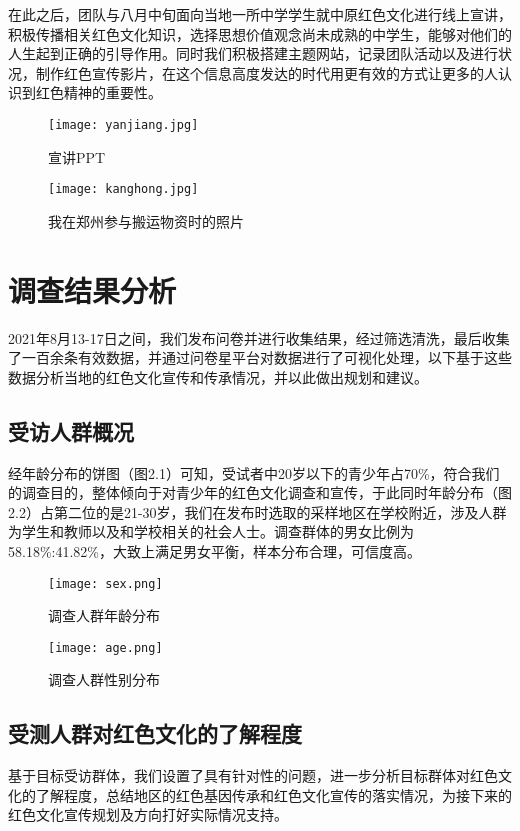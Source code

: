 \documentclass[AutoFakeBold]{LZUThesis}
\begin{document}
在此之后，团队与八月中旬面向当地一所中学学生就中原红色文化进行线上宣讲，积极传播相关红色文化知识，选择思想价值观念尚未成熟的中学生，能够对他们的人生起到正确的引导作用。同时我们积极搭建主题网站，记录团队活动以及进行状况，制作红色宣传影片，在这个信息高度发达的时代用更有效的方式让更多的人认识到红色精神的重要性。
\begin{figure}[htbp]
    \centering
    \texttt{[image: yanjiang.jpg]}
    \caption{宣讲PPT}
\end{figure}
\begin{figure}[htbp]
    \centering
    \texttt{[image: kanghong.jpg]}
    \caption{我在郑州参与搬运物资时的照片}
\end{figure}
\chapter{调查结果分析}
2021年8月13-17日之间，我们发布问卷并进行收集结果，经过筛选清洗，最后收集了一百余条有效数据，并通过问卷星平台对数据进行了可视化处理，以下基于这些数据分析当地的红色文化宣传和传承情况，并以此做出规划和建议。
\section{受访人群概况}
经年龄分布的饼图（图2.1）可知，受试者中20岁以下的青少年占70\%，符合我们的调查目的，整体倾向于对青少年的红色文化调查和宣传，于此同时年龄分布（图2.2）占第二位的是21-30岁，我们在发布时选取的采样地区在学校附近，涉及人群为学生和教师以及和学校相关的社会人士。调查群体的男女比例为58.18\%:41.82\%，大致上满足男女平衡，样本分布合理，可信度高。


\begin{figure}[htbp]
    \centering
    \texttt{[image: sex.png]}
    \caption{调查人群年龄分布}
\end{figure}

\begin{figure}[htbp]
    \centering
    \texttt{[image: age.png]}
    \caption{调查人群性别分布}
\end{figure}

\section{受测人群对红色文化的了解程度}

基于目标受访群体，我们设置了具有针对性的问题，进一步分析目标群体对红色文化的了解程度，总结地区的红色基因传承和红色文化宣传的落实情况，为接下来的红色文化宣传规划及方向打好实际情况支持。
\end{document}
